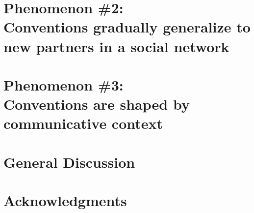 \documentclass[11pt, floatsintext]{apa6}
\begin{document}


\section{Phenomenon \#2: \\ Conventions gradually generalize to new partners in a social network}



\section{Phenomenon \#3: \\ Conventions are shaped by communicative context}



\section{General Discussion}



\section{\bf Acknowledgments}
\small




\renewcommand{\thefigure}{A\arabic{figure}}
\renewcommand{\thetable}{A\arabic{table}}
\setcounter{table}{0}
\setcounter{figure}{0}
\end{document}
